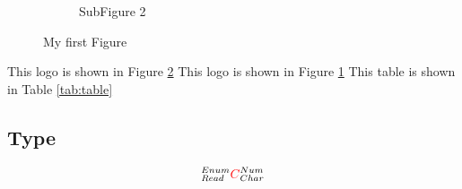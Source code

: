 \documentclass[a4paper,12pt]{article}
\begin{document}
\begin{figure}[hbt]
\begin{center}
\begin{subfigure}{0.4\textwidth}
        \caption{SubFigure 2}
        \label{subfig:logo2}
      \end{subfigure}
      \caption{My first Figure}
      \label{fig:logo}
    \end{center}
  \end{figure}
  \blindtext[1]
  This logo is shown in Figure \ref{fig:logo}
  This logo is shown in Figure \ref{subfig:logo2}
  This table is shown in Table \ref{tab:table}
 
\subsection{Type}
{\Large
  \begin{equation}
    ^{Enum}_{Read}{\color{red}C}^{Num}_{Char}
  \end{equation}
}

\listoffigures
\listoftables
\end{document}

